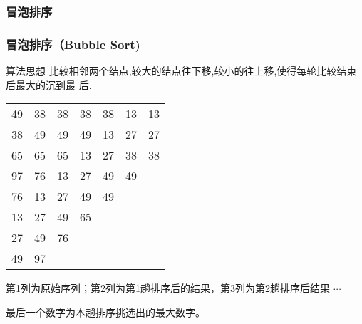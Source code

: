 \subsubsection{冒泡排序}
\begin{frame}
  \frametitle{冒泡排序（Bubble Sort)}
  \begin{infobox}{算法思想}
    比较相邻两个结点,较大的结点往下移,较小的往上移,使得每轮比较结束后最大的沉到最
    后.
  \end{infobox}

  \newpage
  
  \begin{center}
    \begin{tabular}{|p{0.6cm}|p{0.6cm}|p{0.6cm}|p{0.6cm}|p{0.6cm}|p{0.6cm}|p{0.6cm}|}
      \hline
      49 & 38 & 38 & 38 & 38 & 13 & \cellcolor{red!15} 13 \\
      38 & 49 & 49 & 49 & 13 & 27 & \cellcolor{red!15} 27 \\
      65 & 65 & 65 & 13 & 27 & 38 & \cellcolor{red!15} 38 \\
      97 & 76 & 13 & 27 & 49 & \cellcolor{red!15} 49 & ~ \\
      76 & 13 & 27 & 49 & \cellcolor{red!15} 49 & ~  & ~ \\
      13 & 27 & 49 & \cellcolor{red!15}  65 &    &    &   \\
      27 & 49 & \cellcolor{red!15}  76 &    &    &    &   \\
      49 & \cellcolor{red!15} 97 &    &    &    &    &   \\
      \hline  
    \end{tabular}
  \end{center}
  第1列为原始序列；第2列为第1趟排序后的结果，第3列为第2趟排序后结果 $\cdots$

  最后一个数字为本趟排序挑选出的最大数字。
  
\end{frame}